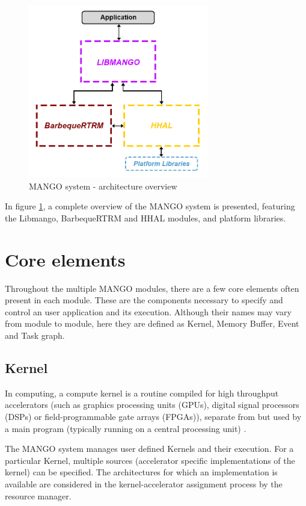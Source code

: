 \begin{figure}[ht]
    \centering
    \includegraphics[width=0.7\textwidth]{img/architecture.png}
    \captionsetup{justification=centering}
    \caption{MANGO system - architecture overview}
    \label{fig:mango_system_overview}
\end{figure}

In figure \ref{fig:mango_system_overview}, a complete overview of the MANGO system is presented, featuring the Libmango, BarbequeRTRM and HHAL modules, and platform libraries.

\section{Core elements}
Throughout the multiple MANGO modules, there are a few core elements often present in each module. These are the components necessary to specify and control an user application and its execution. Although their names may vary from module to module, here they are defined as Kernel, Memory Buffer, Event and Task graph.

\subsection{Kernel}
In computing, a compute kernel is a routine compiled for high throughput accelerators (such as graphics processing units (GPUs), digital signal processors (DSPs) or field-programmable gate arrays (FPGAs)), separate from but used by a main program (typically running on a central processing unit) \cite{kernel_wikipedia}. 

The MANGO system manages user defined Kernels and their execution. For a particular Kernel, multiple sources (accelerator specific implementations of the kernel) can be specified. The architectures for which an implementation is available are considered in the kernel-accelerator assignment process by the resource manager. 

